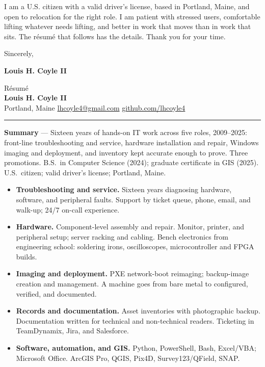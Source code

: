 \documentclass[10pt,letterpaper]{article}
\makeatletter
\newcommand{\sect}[1]{\vspace{6pt}{\scshape\textls[60]{#1}}\par\vspace{-2pt}}
\newcommand{\contactline}{Portland, Maine \textbullet{} \href{mailto:lhcoyle4@gmail.com}{lhcoyle4@gmail.com} \textbullet{} \href{https://github.com/lhcoyle4}{github.com/lhcoyle4}}
\makeatother
\begin{document}
I am a U.S. citizen with a valid driver's license, based in Portland, Maine, and open to relocation for the right role. I am patient with stressed users, comfortable lifting whatever needs lifting, and better in work that moves than in work that sits. The r\'esum\'e that follows has the details. Thank you for your time.

\vspace{10pt}
Sincerely,

\vspace{14pt}
\textbf{Louis H. Coyle II}

\newpage
\begin{center}
  {\LARGE R\'esum\'e}\\[5pt]
  {\normalsize\textbf{Louis H. Coyle II}}\\[3pt]
  {\small \contactline{}}
\end{center}
\vspace{2pt}\hrule\vspace{10pt}

\textbf{Summary} --- Sixteen years of hands-on IT work across five roles, 2009--2025: front-line troubleshooting and service, hardware installation and repair, Windows imaging and deployment, and inventory kept accurate enough to prove. Three promotions. B.S.\ in Computer Science (2024); graduate certificate in GIS (2025). U.S.\ citizen; valid driver's license; Portland, Maine.

\sect{Core Capabilities}
\begin{itemize}
  \item \textbf{Troubleshooting and service.} Sixteen years diagnosing hardware, software, and peripheral faults. Support by ticket queue, phone, email, and walk-up; 24/7 on-call experience.
  \item \textbf{Hardware.} Component-level assembly and repair. Monitor, printer, and peripheral setup; server racking and cabling. Bench electronics from engineering school: soldering irons, oscilloscopes, microcontroller and FPGA builds.
  \item \textbf{Imaging and deployment.} PXE network-boot reimaging; backup-image creation and management. A machine goes from bare metal to configured, verified, and documented.
  \item \textbf{Records and documentation.} Asset inventories with photographic backup. Documentation written for technical and non-technical readers. Ticketing in TeamDynamix, Jira, and Salesforce.
  \item \textbf{Software, automation, and GIS.} Python, PowerShell, Bash, Excel/VBA; Microsoft Office. ArcGIS Pro, QGIS, Pix4D, Survey123/QField, SNAP.
\end{itemize}
\end{document}
